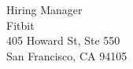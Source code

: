 \documentclass{letter} %
\begin{document}
\signature{Subhrangshu Nandi}           %
\longindentation=0pt                       %
\let\raggedleft\raggedright                %
 
 
\begin{letter}
{Hiring Manager \\
Fitbit \\
405 Howard St, Ste 550 \\
San Francisco, CA 94105
}




\end{letter}
\end{document}

